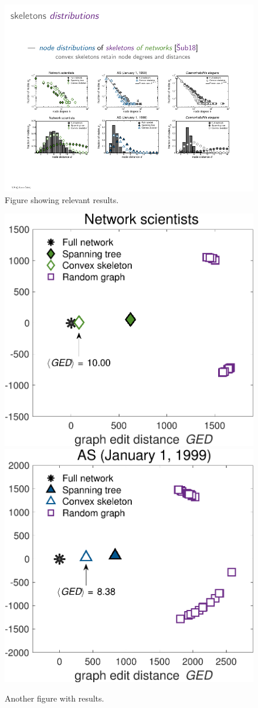 \documentclass[9pt,twocolumn,twoside]{pnas-report}
\begin{document}
\lipsum[4-6]

\begin{figure}[b]\centering%
	\includegraphics[width=\linewidth]{distributions}
	\caption{Figure showing relevant results.~\cite{Sub18a}}
\end{figure}

\begin{figure}[t]\centering%
	\includegraphics[width=0.45\linewidth]{results1}\hskip12pt
	\includegraphics[width=0.45\linewidth]{results2}
	\caption{Another figure with results.~\cite{Sub18a}}
	\label{fig:example}
\end{figure}
\end{document}
